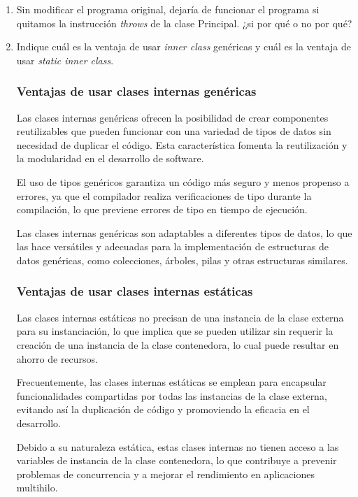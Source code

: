 \documentclass[11pt, twocolumn]{article}
\begin{document}
  \begin{enumerate}
    \item Sin modificar el programa original, dejaría de funcionar el programa si quitamos la instrucción \textit{throws} de la clase Principal. ¿si por qué o no por qué?
    


    \item Indique cuál es la ventaja de usar \textit{inner class} genéricas y cuál es la ventaja de usar \textit{static inner class}.
    
    \subsubsection*{Ventajas de usar clases internas genéricas}
    Las clases internas genéricas ofrecen la posibilidad de crear componentes reutilizables que pueden funcionar con una variedad de tipos de datos sin necesidad de duplicar el código. Esta característica fomenta la reutilización y la modularidad en el desarrollo de software.

    El uso de tipos genéricos garantiza un código más seguro y menos propenso a errores, ya que el compilador realiza verificaciones de tipo durante la compilación, lo que previene errores de tipo en tiempo de ejecución.

    Las clases internas genéricas son adaptables a diferentes tipos de datos, lo que las hace versátiles y adecuadas para la implementación de estructuras de datos genéricas, como colecciones, árboles, pilas y otras estructuras similares.

    \subsubsection*{Ventajas de usar clases internas estáticas}
    Las clases internas estáticas no precisan de una instancia de la clase externa para su instanciación, lo que implica que se pueden utilizar sin requerir la creación de una instancia de la clase contenedora, lo cual puede resultar en ahorro de recursos.

    Frecuentemente, las clases internas estáticas se emplean para encapsular funcionalidades compartidas por todas las instancias de la clase externa, evitando así la duplicación de código y promoviendo la eficacia en el desarrollo.

    Debido a su naturaleza estática, estas clases internas no tienen acceso a las variables de instancia de la clase contenedora, lo que contribuye a prevenir problemas de concurrencia y a mejorar el rendimiento en aplicaciones multihilo.
    

\end{enumerate}
\end{document}
